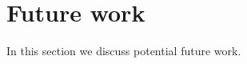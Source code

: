 \section{Future work}\label{sec:futurework}
In this section we discuss potential future work.
\begin{comment}
\subsection{Encapsulation}
The biggest limitation of our approach is the inability to model visibility restrictions. For example, the absence
of support for private/protected methods in Java 8 interfaces forces all
members of interfaces to be public, including static methods. Since we use
abstract methods to encode state, our state is always all public. Still, because
the state can only be accessed by methods, it
is impossible for the user to know if a certain method maps directly to a field
or if it has a default implementation.  If the user wants a constructor that
does not directly maps to the fields, (as for secondary constructors in Scala)
he can simply define its own \Q@of@ method and delegate on the generated one:
\begin{lstlisting}
@Obj interface Point {  int x(); int y();
    static Point of(int val){return Point.of(val,val);} }
\end{lstlisting}
However, the generated \Q@of@ method would also be present and public.  If a
future version of Java was to support \emph{static private methods in
  interfaces} we could extend our code generation to handle also encapsulation.

However, interfaces as a whole can have public or
package private (java default) visibility.

We can add a second annotation \Q!@Exposed!  that leverages on this edge: An
interface without exposed works as usual, but if any method of a public \mixin
interface is annotated with \Q!@Exposed!, we can apply a translation where a new
(package private) interface type is introduced, and the original interface become
just a facade.  For example:
\begin{lstlisting}
@Obj public interface Person{
  void name(String val);
  @Exposed default void rename(String newName){ if(/*valid name*/){ this.name(val);}}
  @Exposed String name();
  @Exposed static Person from(String val){ if(/*valid name*/){return Person.of(val);}
    throw /*invalid name*/}  }
\end{lstlisting}
becomes
\begin{lstlisting}
public interface Person{
  void rename(String newName)
  String name();
  static Person from(String val){ return Person$.from(val);} }


\end{comment}
